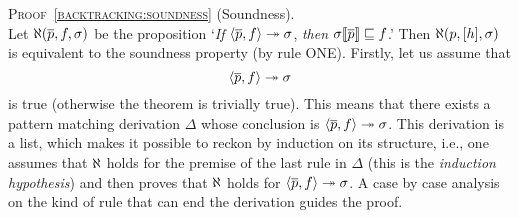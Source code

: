 
\noindent\textsc{Proof~\ref{backtracking:soundness}} (Soundness).\\
\noindent Let \(\ind{R}(\overline{p}, f, \sigma)\) be the proposition
`\emph{If} \(\smj{f}{\overline{p}}{\sigma}\),
\emph{then} \(\subst{\overline{p}}{\sigma} \sqsubseteq f\).'
Then \(\ind{R}(p, [h], \sigma)\) is equivalent to the soundness
property (by rule \textsf{ONE}). Firstly, let us assume that
\begin{equation}
  \smj{f}{\overline{p}}{\sigma} \label{x:sound:head}
\end{equation}
is true (otherwise the theorem is trivially true). This means that
there exists a pattern matching derivation \(\Delta\) whose conclusion
is \(\smj{f}{\overline{p}}{\sigma}\). This derivation is a list, which
makes it possible to reckon by induction on its structure, i.e., one
assumes that \(\ind{R}\) holds for the premise of the last rule in
\(\Delta\) (this is the \emph{induction hypothesis}) and then proves
that \(\ind{R}\) holds for \(\smj{f}{\overline{p}}{\sigma}\). A case
by case analysis on the kind of rule that can end the derivation
guides the proof.
